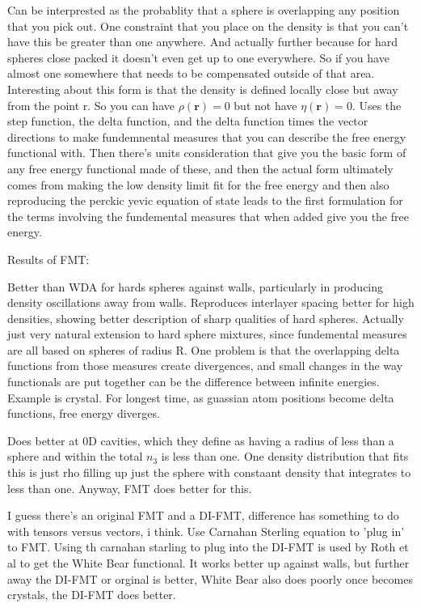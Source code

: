 \documentclass[pdftex,10pt,a4paper]{article}
\begin{document}
Can be interprested as the probablity that a sphere is overlapping any position that you pick out. One constraint that you place on the density is that you can't have this be greater than one anywhere.  And actually further because for hard spheres close packed it doesn't even get up to one everywhere.  So if you have almost one somewhere that needs to be compensated outside of that area.  Interesting about this form is that the density is defined locally close but away from the point r.  So you can have $\rho(\mathbf{r})=0$ but not have $\eta(\mathbf{r})=0$.  Uses the step function, the delta function, and the delta function times the vector directions to make fundemnental measures that you can describe the free energy functional with.  Then there's units consideration that give you the basic form of any free energy functional made of these, and then the actual form ultimately comes from making the low density limit fit for the free energy and then also reproducing the perckic yevic equation of state leads to the first formulation for the terms involving the fundemental measures that when added give you the free energy.

Results of FMT:

Better than WDA for hards spheres against walls, particularly in producing density oscillations away from walls.  Reproduces interlayer spacing better for high densities, showing better description of sharp qualities of hard spheres.  Actually just very natural extension to hard sphere mixtures, since fundemental measures are all based on spheres of radius R.  One problem is that the overlapping delta functions from those measures create divergences, and small changes in the way functionals are put together can be the difference between infinite energies.  Example is crystal.  For longest time, as guassian atom positions become delta functions, free energy diverges.

Does better at 0D cavities, which they define as having a radius of less than a sphere and within the total $n_3$ is less than one.  One density distribution that fits this is just rho filling up just the sphere with constaant density that integrates to less than one.  Anyway, FMT does better for this.

I guess there's an original FMT and a DI-FMT, difference has something to do with tensors versus vectors, i think.  Use Carnahan Sterling equation to 'plug in' to FMT.  Using th carnahan starling to plug into the DI-FMT is used by Roth et al to get the White Bear functional.  It works better up against walls, but further away the DI-FMT or orginal is better, White Bear also does poorly once becomes crystals, the DI-FMT does better.
\end{document}
